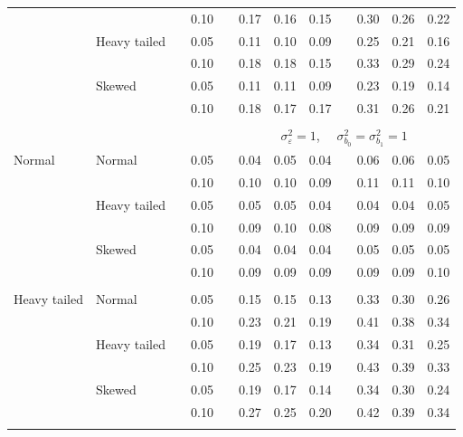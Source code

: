 \documentclass[12pt]{article} %
\begin{document}
\begin{table}[ht]
\begin{scriptsize}
\begin{center}
\begin{tabular}{ll p{.1cm} c p{.1cm} rrr p{.1cm} rrr}
             &              && 0.10 &&  0.17 & 0.16 & 0.15 && 0.30 & 0.26 & 0.22 \\ 
             & Heavy tailed && 0.05 &&  0.11 & 0.10 & 0.09 && 0.25 & 0.21 & 0.16 \\ 
             &              && 0.10 &&  0.18 & 0.18 & 0.15 && 0.33 & 0.29 & 0.24 \\ 
             & Skewed       && 0.05 &&  0.11 & 0.11 & 0.09 && 0.23 & 0.19 & 0.14 \\ 
             &              && 0.10 &&  0.18 & 0.17 & 0.17 && 0.31 & 0.26 & 0.21 \\ 

&&&&&&&&&&&\\
& && && \multicolumn{7}{c}{$\sigma_{\varepsilon}^2 = 1$, \ \ $\sigma_{b_0}^2 = \sigma_{b_1}^2 = 1$} \\ \cline{6-12}
\rowcolor{gray!20}Normal       & Normal       && 0.05 &&  0.04 & 0.05 & 0.04 && 0.06 & 0.06 & 0.05 \\ 
\rowcolor{gray!20}             &              && 0.10 &&  0.10 & 0.10 & 0.09 && 0.11 & 0.11 & 0.10 \\ 
\rowcolor{gray!20}             & Heavy tailed && 0.05 &&  0.05 & 0.05 & 0.04 && 0.04 & 0.04 & 0.05 \\ 
\rowcolor{gray!20}             &              && 0.10 &&  0.09 & 0.10 & 0.08 && 0.09 & 0.09 & 0.09 \\ 
\rowcolor{gray!20}             & Skewed       && 0.05 &&  0.04 & 0.04 & 0.04 && 0.05 & 0.05 & 0.05 \\ 
\rowcolor{gray!20}             &              && 0.10 &&  0.09 & 0.09 & 0.09 && 0.09 & 0.09 & 0.10 \\ 
             &&&&&&&&&&&\\
Heavy tailed & Normal       && 0.05 &&  0.15 & 0.15 & 0.13 && 0.33 & 0.30 & 0.26 \\ 
             &              && 0.10 &&  0.23 & 0.21 & 0.19 && 0.41 & 0.38 & 0.34 \\ 
             & Heavy tailed && 0.05 &&  0.19 & 0.17 & 0.13 && 0.34 & 0.31 & 0.25 \\ 
             &              && 0.10 &&  0.25 & 0.23 & 0.19 && 0.43 & 0.39 & 0.33 \\ 
             & Skewed       && 0.05 &&  0.19 & 0.17 & 0.14 && 0.34 & 0.30 & 0.24 \\ 
             &              && 0.10 &&  0.27 & 0.25 & 0.20 && 0.42 & 0.39 & 0.34 \\ 
             &&&&&&&&&&&\\

\end{tabular}
\end{center}
\end{scriptsize}
\end{table}
\end{document}
